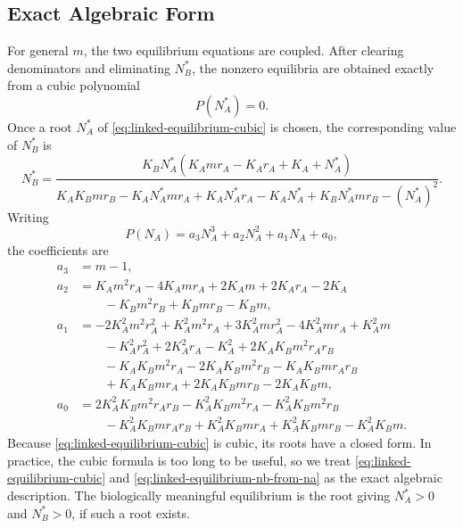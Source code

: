 \documentclass{article}
\numberwithin{equation}{section}
\begin{document}
\subsection{Exact Algebraic Form}
For general $m$, the two equilibrium equations are coupled. After
clearing denominators and eliminating $N_B^*$, the nonzero equilibria are
obtained exactly from a cubic polynomial
\begin{equation}
    \label{eq:linked-equilibrium-cubic}
    P(N_A^*)=0.
\end{equation}
Once a root $N_A^*$ of \eqref{eq:linked-equilibrium-cubic} is chosen,
the corresponding value of $N_B^*$ is
\begin{equation}
    \label{eq:linked-equilibrium-nb-from-na}
    N_B^*
    =
    \frac{
        K_B N_A^*
        \left(K_A m r_A - K_A r_A + K_A + N_A^*\right)
    }{
        K_AK_Bmr_B
        -K_A N_A^*mr_A
        +K_A N_A^*r_A
        -K_A N_A^*
        +K_B N_A^*mr_B
        -(N_A^*)^2
    }.
\end{equation}
Writing
$$
    P(N_A)=a_3N_A^3+a_2N_A^2+a_1N_A+a_0,
$$
the coefficients are
\begin{align*}
    a_3 &= m-1,\\
    a_2
        &= K_A m^2r_A -4K_A mr_A +2K_A m +2K_A r_A -2K_A\\
        &\qquad{} -K_Bm^2r_B +K_Bmr_B-K_Bm,\\
    a_1
        &= -2K_A^2m^2r_A^2+K_A^2m^2r_A+3K_A^2mr_A^2
           -4K_A^2mr_A+K_A^2m\\
        &\qquad{} -K_A^2r_A^2+2K_A^2r_A-K_A^2
           +2K_AK_Bm^2r_Ar_B\\
        &\qquad{} -K_AK_Bm^2r_A-2K_AK_Bm^2r_B
           -K_AK_Bmr_Ar_B\\
        &\qquad{} +K_AK_Bmr_A+2K_AK_Bmr_B-2K_AK_Bm,\\
    a_0
        &= 2K_A^2K_Bm^2r_Ar_B-K_A^2K_Bm^2r_A
           -K_A^2K_Bm^2r_B\\
        &\qquad{} -K_A^2K_Bmr_Ar_B+K_A^2K_Bmr_A
           +K_A^2K_Bmr_B-K_A^2K_Bm.
\end{align*}
Because \eqref{eq:linked-equilibrium-cubic} is cubic, its roots have a
closed form. In practice, the cubic formula is too long to be useful, so
we treat \eqref{eq:linked-equilibrium-cubic} and
\eqref{eq:linked-equilibrium-nb-from-na} as the exact algebraic
description. The biologically meaningful equilibrium is the root giving
$N_A^*>0$ and $N_B^*>0$, if such a root exists.
\end{document}
